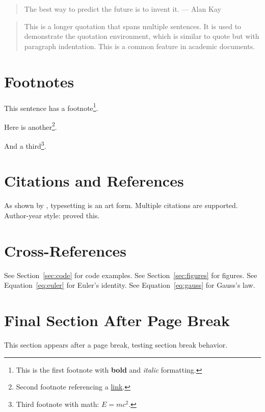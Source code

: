 \documentclass[12pt,twocolumn]{article}
\begin{document}
\begin{quote}
The best way to predict the future is to invent it. --- Alan Kay
\end{quote}

\begin{quotation}
This is a longer quotation that spans multiple sentences. It is used to
demonstrate the quotation environment, which is similar to quote but
with paragraph indentation. This is a common feature in academic documents.
\end{quotation}

\section{Footnotes}

This sentence has a footnote\footnote{This is the first footnote with
\textbf{bold} and \textit{italic} formatting.}.

Here is another\footnote{Second footnote referencing a \href{https://example.com}{link}.}.

And a third\footnote{Third footnote with math: $E = mc^2$.}.

\section{Citations and References}

As shown by \cite{knuth1984}, typesetting is an art form.
Multiple citations \cite{lamport1994,knuth1984} are supported.
Author-year style: \citet{dijkstra1968} proved this.

\section{Cross-References}

See Section~\ref{sec:code} for code examples.
See Section~\ref{sec:figures} for figures.
See Equation~\eqref{eq:euler} for Euler's identity.
See Equation~\eqref{eq:gauss} for Gauss's law.

\newpage

\section{Final Section After Page Break}

This section appears after a page break, testing section break behavior.
\end{document}
